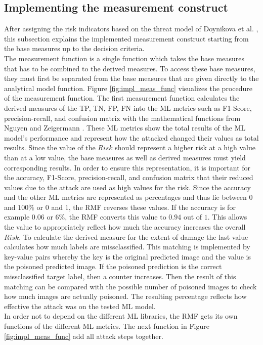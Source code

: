 \subsection{Implementing the measurement construct}

After assigning the risk indicators based on the threat model of Doynikova et al. \cite{DBLP:conf/crisis/DoynikovaNGK20}, this subsection explains the implemented measurement construct starting from the base measures up to the decision criteria. \\
The measurement function is a single function which takes the base measures that has to be combined to the derived measures. To access these base measures, they must first be separated from the base measures that are given directly to the analytical model function. Figure \ref{fig:impl_meas_func} visualizes the procedure of the measurement function. The first measurement function calculates the derived measures of the TP, TN, FP, FN into the ML metrics such as F1-Score, precision-recall, and confusion matrix with the mathematical functions from Nguyen and Zeigermann \cite{9783960101925}. These ML metrics show the total results of the ML model's performance and represent how the attacked changed their values as total results.
Since the value of the $Risk$ should represent a higher risk at a high value than at a low value, the base measures as well as derived measures must yield corresponding results. In order to ensure this representation, it is important for the accuracy, F1-Score, precision-recall, and confusion matrix that their reduced values due to the attack are used as high values for the risk. Since the accuracy and the other ML metrics are represented as percentages and thus lie between $0$ and $100\%$ or $0$ and $1$, the RMF reverses these values. If the accuracy
is for example $0.06$ or $6\%$, the RMF converts this value to $0.94$ out of $1$. This allows the value to appropriately reflect how much the accuracy increases the overall $Risk$. To calculate the derived measure for the extent of damage the last value calculates how much labels are missclassified. This matching is implemented by key-value pairs whereby the key is the original predicted image and the value is the poisoned predicted image. If the poisoned prediction is the correct missclassified target label, then a counter increases. Then the result of this matching can be compared with the possible number of poisoned images to check how much images are actually poisoned. The resulting percentage reflects how effective the attack was on the tested ML model. \\
In order not to depend on the different ML libraries, the RMF gets its own functions of the different ML metrics. The next function in Figure \ref{fig:impl_meas_func} add all attack steps together.

